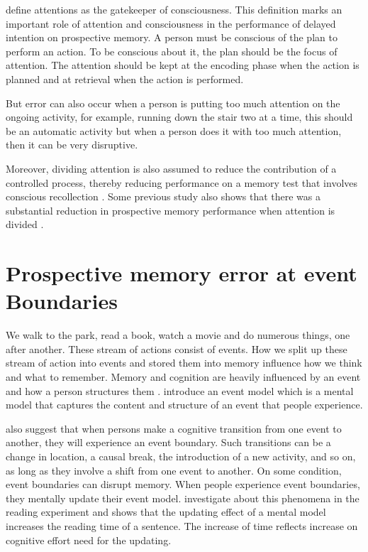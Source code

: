 \cite{Reason1984} define attentions as the gatekeeper of consciousness. This definition marks an important role of attention and consciousness in the performance of delayed intention on prospective memory. A person must be conscious of the plan to perform an action. To be conscious about it, the plan should be the focus of attention. The attention should be kept at the encoding phase when the action is planned and at retrieval when the action is performed.

But error can also occur when a person is putting too much attention on the ongoing activity, for example, running down the stair two at a time, this should be an automatic activity but when a person does it with too much attention, then it can be very disruptive.

Moreover, dividing attention is also assumed to reduce the contribution of a controlled process, thereby
reducing performance on a memory test that involves conscious recollection \citep{Jacoby1989}.
Some previous study also shows that there was a substantial reduction in prospective memory performance when attention is divided \citep{McDaniel1998}
\citep{10.1371/journal.pone.0074447}.


\section{Prospective memory error at event Boundaries}

We walk to the park, read a book, watch a movie and do numerous things, one after another. These stream of actions consist of events. How we split up these stream of action into events and stored them into memory influence how we think and what to remember. Memory and cognition are heavily influenced by an event and how a person structures them \citep{Radvansky2012}. \cite{Radvansky2011} introduce an event model which is a mental model that captures the content and structure of an event that people experience.

\cite{Radvansky2012} also suggest that when persons make a cognitive transition from one event to another, they will experience an event boundary. Such transitions can be a change in location, a causal break, the introduction of a new activity, and so on, as long as they involve a shift from one event to another.  On some condition, event boundaries can disrupt memory. When people experience event boundaries, they mentally update their event model. \cite{Radvansky2010} investigate about this phenomena in the reading experiment and shows that the updating effect of a mental model increases the reading time of a sentence.
 The increase of time reflects increase on cognitive effort need for the updating.


